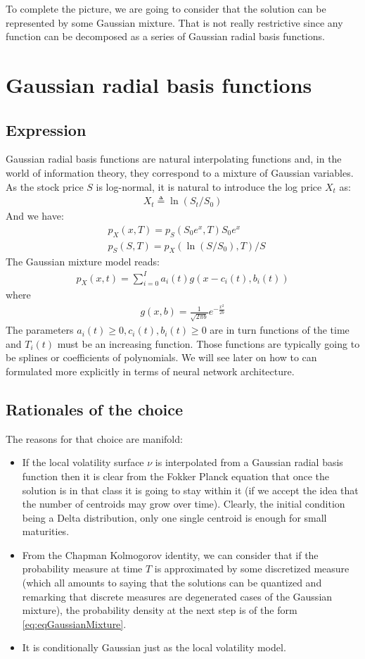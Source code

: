 \documentclass[10pt,a4paper]{article}
\begin{document}
To complete the picture, we are going to consider that the solution can be represented by some Gaussian mixture. That is not really restrictive since any function can be decomposed as a series of Gaussian radial basis functions. 

\section{Gaussian radial basis functions}
\subsection{Expression}
Gaussian radial basis functions are natural interpolating functions and, in the world of information theory, they correspond to a mixture of Gaussian variables. 
As the stock price $S$ is log-normal, it is natural to introduce the log price $X_t$ as:
\begin{align}
X_t \triangleq  \ln(S_t/S_0)
\end{align}
And we have:
\begin{align}
&p_X(x,T) = p_S(S_0 e^x,T) S_0 e^x\\
&p_S(S,T) = p_X(\ln(S/S_0),T)/S
\end{align}
The Gaussian mixture model reads:
\begin{align}\label{eq:eqGaussianMixture}
p_X(x,t) = \sum_{i=0}^{I} a_i(t) g(x-c_i(t), b_i(t))
\end{align}
where
\begin{align}
g(x,b) = \frac{1}{\sqrt{2\pi b}} e^{-\frac{x^2}{2b}}
\end{align}
The parameters $a_i(t)\geq 0,c_i(t),b_i(t)\geq 0$ are in turn functions of the time and $T_i(t)$ must be an increasing function. Those functions are typically going to be splines or coefficients of polynomials. We will see later on how to can formulated more explicitly in terms of neural network architecture.

\subsection{Rationales of the choice}
The reasons for that choice are manifold:
\begin{itemize}
\item If the local volatility surface $\nu$ is interpolated from a Gaussian radial basis function then it is clear from the Fokker Planck equation that  once the solution is in that class it is going to stay within it (if we accept the idea that the number of centroids may grow over time). Clearly, the initial condition being a Delta distribution, only one single centroid is enough for small maturities.
\item From the Chapman Kolmogorov identity, we can consider that if the probability measure at time $T$ is approximated by some discretized measure (which all amounts to saying that the solutions can be quantized and remarking that discrete measures are degenerated cases of the Gaussian mixture), the probability density at the next step is of the form \ref{eq:eqGaussianMixture}.
\item It is conditionally Gaussian just as the local volatility model.
\end{itemize}
\end{document}
